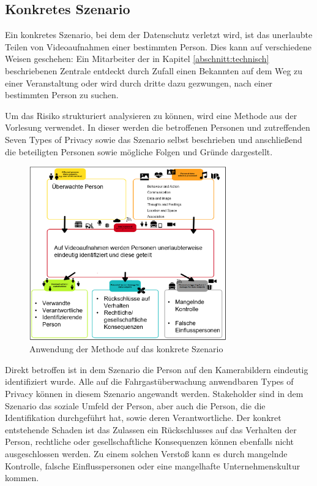 \subsection{Konkretes Szenario}
\label{abschnitt:konkret}
Ein konkretes Szenario, bei dem der Datenschutz verletzt wird, ist das unerlaubte Teilen von Videoaufnahmen einer bestimmten Person. Dies kann auf verschiedene Weisen geschehen: Ein Mitarbeiter der in
Kapitel \ref{abschnitt:technisch} beschriebenen Zentrale entdeckt durch Zufall einen Bekannten auf dem Weg zu einer Veranstaltung oder wird durch dritte dazu gezwungen, nach einer bestimmten Person zu suchen.

Um das Risiko strukturiert analysieren zu können, wird eine Methode aus der Vorlesung verwendet. In dieser werden die betroffenen Personen und zutreffenden \glqq{}Seven Types of Privacy\grqq{} sowie das Szenario selbst beschrieben
und anschließend die beteiligten Personen sowie mögliche Folgen und Gründe dargestellt.
\begin{figure}[ht]
      \begin{center}
            \includegraphics[width= 0.76\textwidth]{Bilder/privacy.png}
            \caption{Anwendung der Methode auf das konkrete Szenario}
            \label{fig:Privacy}
      \end{center}
\end{figure}
\newline
Direkt betroffen ist in dem Szenario die Person auf den Kamerabildern eindeutig identifiziert wurde. Alle auf die Fahrgastüberwachung anwendbaren Types of Privacy können in diesem Szenario angewandt werden.
Stakeholder sind in dem Szenario das soziale Umfeld der Person, aber auch die Person, die die Identifikation durchgeführt hat, sowie deren Verantwortliche. Der konkret entstehende Schaden ist das Zulassen ein Rückschlusses
auf das Verhalten der Person, rechtliche oder gesellschaftliche Konsequenzen können ebenfalls nicht ausgeschlossen werden. Zu einem solchen Verstoß kann es durch mangelnde Kontrolle, falsche
Einflusspersonen oder eine mangelhafte Unternehmenskultur kommen.

